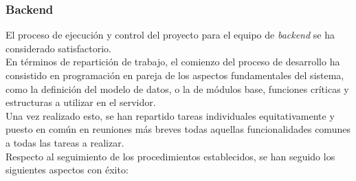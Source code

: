 \documentclass[11pt, a4paper, titlepage]{article}
\begin{document}
\subsubsection{Backend}

El proceso de ejecución y control del proyecto para el equipo de \textit{backend} se ha considerado satisfactorio.\\


En términos de repartición de trabajo, el comienzo del proceso de desarrollo ha consistido en programación en pareja de los aspectos fundamentales del sistema, como la definición del modelo de datos, o la de módulos base, funciones críticas y estructuras a utilizar en el servidor. \\

Una vez realizado esto, se han repartido tareas individuales equitativamente y puesto en común en reuniones más breves todas aquellas funcionalidades comunes a todas las tareas a realizar. \\


Respecto al seguimiento de los procedimientos establecidos, se han seguido los siguientes aspectos con éxito:
\end{document}
